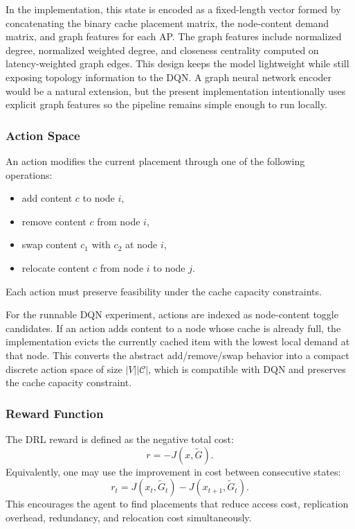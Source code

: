 In the implementation, this state is encoded as a fixed-length vector formed by concatenating the binary cache placement matrix, the node-content demand matrix, and graph features for each AP. The graph features include normalized degree, normalized weighted degree, and closeness centrality computed on latency-weighted graph edges. This design keeps the model lightweight while still exposing topology information to the DQN. A graph neural network encoder would be a natural extension, but the present implementation intentionally uses explicit graph features so the pipeline remains simple enough to run locally.

\subsubsection{Action Space}
An action modifies the current placement through one of the following operations:
\begin{itemize}
    \item add content \(c\) to node \(i\),
    \item remove content \(c\) from node \(i\),
    \item swap content \(c_1\) with \(c_2\) at node \(i\),
    \item relocate content \(c\) from node \(i\) to node \(j\).
\end{itemize}
Each action must preserve feasibility under the cache capacity constraints.

For the runnable DQN experiment, actions are indexed as node-content toggle candidates. If an action adds content to a node whose cache is already full, the implementation evicts the currently cached item with the lowest local demand at that node. This converts the abstract add/remove/swap behavior into a compact discrete action space of size \(|V||\mathcal{C}|\), which is compatible with DQN and preserves the cache capacity constraint.

\subsubsection{Reward Function}
The DRL reward is defined as the negative total cost:
\[
r = -J(x,\tilde{G}).
\]
Equivalently, one may use the improvement in cost between consecutive states:
\[
r_t = J(x_t,\tilde{G}_t) - J(x_{t+1},\tilde{G}_t).
\]
This encourages the agent to find placements that reduce access cost, replication overhead, redundancy, and relocation cost simultaneously.

